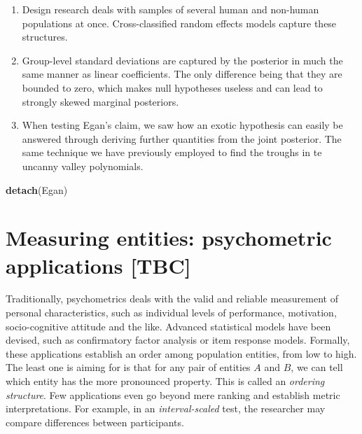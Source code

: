 \documentclass[]{svmono}
\newenvironment{Shaded}{\begin{snugshade}}{\end{snugshade}}
\newcommand{\KeywordTok}[1]{\textcolor[rgb]{0.13,0.29,0.53}{\textbf{#1}}}
\newcommand{\NormalTok}[1]{#1}
\providecommand{\tightlist}{%
  \setlength{\itemsep}{0pt}\setlength{\parskip}{0pt}}
\begin{document}
\begin{enumerate}
\def\labelenumi{\arabic{enumi}.}
\tightlist
\item
  Design research deals with samples of several human and non-human
  populations at once. Cross-classified random effects models capture
  these structures.
\item
  Group-level standard deviations are captured by the posterior in much
  the same manner as linear coefficients. The only difference being that
  they are bounded to zero, which makes null hypotheses useless and can
  lead to strongly skewed marginal posteriors.
\item
  When testing Egan's claim, we saw how an exotic hypothesis can easily
  be answered through deriving further quantities from the joint
  posterior. The same technique we have previously employed to find the
  troughs in te uncanny valley polynomials.
\end{enumerate}

\begin{Shaded}
\begin{Highlighting}[]
\KeywordTok{detach}\NormalTok{(Egan)}
\end{Highlighting}
\end{Shaded}

\section{Measuring entities: psychometric applications
{[}TBC{]}}\label{measuring-entities-psychometric-applications-tbc}

Traditionally, psychometrics deals with the valid and reliable
measurement of personal characteristics, such as individual levels of
performance, motivation, socio-cognitive attitude and the like. Advanced
statistical models have been devised, such as confirmatory factor
analysis or item response models. Formally, these applications establish
an order among population entities, from low to high. The least one is
aiming for is that for any pair of entities \(A\) and \(B\), we can tell
which entity has the more pronounced property. This is called an
\emph{ordering structure}. Few applications even go beyond mere ranking
and establish metric interpretations. For example, in an
\emph{interval-scaled} test, the researcher may compare differences
between participants.
\end{document}
